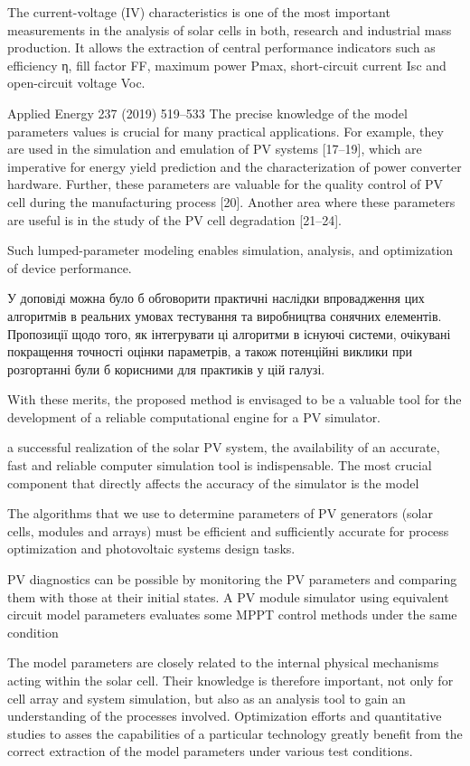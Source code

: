 \documentclass[a4paper,fleqn]{cas-sc}
\begin{document}
The current-voltage (IV) characteristics is one of the most important
measurements in the analysis of solar cells in both, 
research and industrial mass production. 
It allows the extraction of central performance indicators such as efficiency η, fill factor FF, maximum power Pmax,
short-circuit current Isc and open-circuit voltage Voc. 

Applied Energy 237 (2019) 519–533
The precise knowledge of the model parameters values is crucial for
many practical applications. For example, they are used in the simulation
and emulation of PV systems [17–19], which are imperative for energy yield
prediction and the characterization of power converter hardware. Further,
these parameters are valuable for the quality control of PV cell during the
manufacturing process [20]. Another area where these parameters are useful
is in the study of the PV cell degradation [21–24]. 

Such lumped-parameter modeling enables simulation, analysis, and optimization of
device performance. 



У доповіді можна було б обговорити практичні наслідки впровадження цих алгоритмів
в реальних умовах тестування та виробництва сонячних елементів.
Пропозиції щодо того, як інтегрувати ці алгоритми в існуючі системи, очікувані покращення
точності оцінки параметрів, а також потенційні виклики при розгортанні були б корисними для практиків у цій галузі.

With these merits,
the proposed method is envisaged to be a valuable tool for the
development of a reliable computational engine for a PV
simulator.

a successful realization of the solar PV system, the
availability of an accurate, fast and reliable computer
simulation tool is indispensable. The most crucial component
that directly affects the accuracy of the simulator is the model

The algorithms that we use to determine parameters of PV generators (solar cells, modules and arrays) 
must be efficient and sufficiently accurate for process optimization and photovoltaic systems design tasks. 

PV diagnostics can be possible by monitoring the PV parameters and
comparing them with those at their initial states. A PV module simulator using equivalent circuit model parameters evaluates some MPPT control methods under the same condition

The model parameters are
closely related to the internal physical mechanisms acting within the solar cell. Their
knowledge is therefore important, not only for cell array and system simulation, but
also as an analysis tool to gain an understanding of the processes involved.
Optimization efforts and quantitative studies to asses the capabilities of a particular
technology greatly benefit from the correct extraction of the model parameters under
various test conditions.
\end{document}
